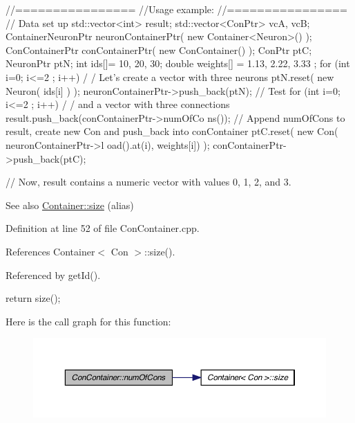 \begin{DoxyCode}
  //================
  //Usage example:
  //================
        // Data set up
                                std::vector<int> result;
                                std::vector<ConPtr> vcA, vcB;
                                ContainerNeuronPtr      neuronContainerPtr( new 
      Container<Neuron>() );
                                ConContainerPtr conContainerPtr( new 
      ConContainer() );
                                ConPtr  ptC;
                                NeuronPtr ptN;
                                int ids[]= {10, 20, 30};
                                double weights[] = {1.13, 2.22, 3.33 };
                                for (int i=0; i<=2 ; i++) {                             /
      / Let's create a vector with three neurons
                                        ptN.reset( new Neuron( ids[i] ) );
                                        neuronContainerPtr->push_back(ptN);
                                }
        // Test
                                for (int i=0; i<=2 ; i++) {                             /
      / and a vector with three connections
                                        result.push_back(conContainerPtr->numOfCo
      ns());          // Append numOfCons to result, create new Con and push_back into 
      conContainer
                                        ptC.reset( new Con( neuronContainerPtr->l
      oad().at(i), weights[i]) );
                                        conContainerPtr->push_back(ptC);
                                }

        // Now, result contains a numeric vector with values 0, 1, 2, and 3.
\end{DoxyCode}


\begin{DoxySeeAlso}{See also}
\hyperlink{class_container_a842c3d9eca81b78b59112fde9707b091}{Container::size} (alias) 
\end{DoxySeeAlso}


Definition at line 52 of file ConContainer.cpp.



References Container$<$ Con $>$::size().



Referenced by getId().


\begin{DoxyCode}
{
  return size();
}
\end{DoxyCode}


Here is the call graph for this function:\nopagebreak
\begin{figure}[H]
\begin{center}
\leavevmode
\includegraphics[width=370pt]{class_con_container_a8895e2c10e223e9950028f595588b9fe_cgraph}
\end{center}
\end{figure}




